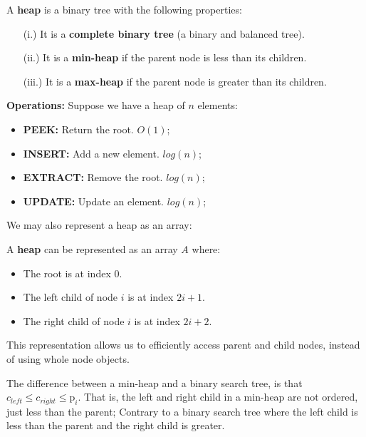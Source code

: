 \begin{Def}[Heap]

    A \textbf{heap} is a binary tree with the following properties:
    \begin{enumerate}
        \item[(i.)] It is a \textbf{complete binary tree} (a binary and balanced tree).
        \item[(ii.)] It is a \textbf{min-heap} if the parent node is less than its children.
        \item[(iii.)] It is a \textbf{max-heap} if the parent node is greater than its children.
    \end{enumerate}
    \noindent
    \textbf{Operations:} Suppose we have a heap of $n$ elements:
    \begin{itemize}
        \item \textbf{PEEK:} Return the root. $O(1)$;
        \item \textbf{INSERT:} Add a new element. $log(n)$;
        \item \textbf{EXTRACT:} Remove the root. $log(n)$;
        \item \textbf{UPDATE:} Update an element. $log(n)$;
    \end{itemize}
\end{Def}

\newpage

\noindent
We may also represent a heap as an array:
\begin{Def}
    A \textbf{heap} can be represented as an array $A$ where:
    \begin{itemize}
        \item The root is at index $0$.
        \item The left child of node $i$ is at index $2i + 1$.
        \item The right child of node $i$ is at index $2i + 2$.
    \end{itemize}
    \noindent
    This representation allows us to efficiently access parent and child nodes, instead of using whole node objects.
\end{Def}

\begin{Tip}
    The difference between a min-heap and a binary search tree, is that $c_{left} \leq c_{right} \leq \text{p}_{i}$. That is, the left and right child in a min-heap are not ordered, just less than the parent;
    Contrary to a binary search tree where the left child is less than the parent and the right child is greater.
\end{Tip}

